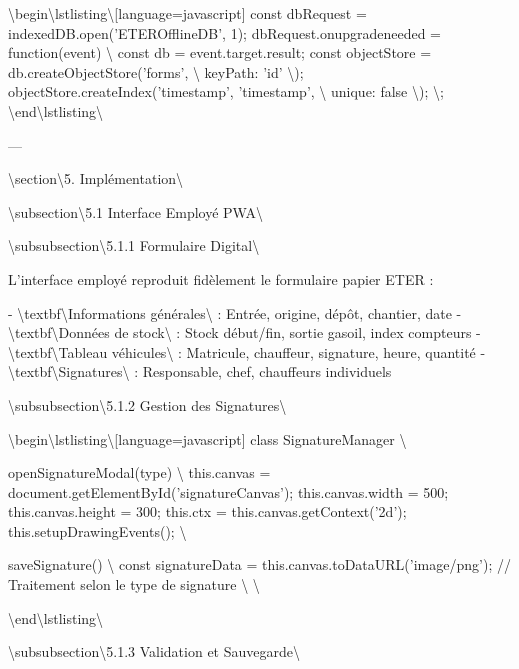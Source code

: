 \documentclass[12pt,a4paper]{report}
\begin{document}
\textbackslash{}begin\textbackslash{}{lstlisting\textbackslash{}}[language=javascript]
const dbRequest = indexedDB.open('ETEROfflineDB', 1);
dbRequest.onupgradeneeded = function(event) \textbackslash{}{
    const db = event.target.result;
    const objectStore = db.createObjectStore('forms', \textbackslash{}{ keyPath: 'id' \textbackslash{}});
    objectStore.createIndex('timestamp', 'timestamp', \textbackslash{}{ unique: false \textbackslash{}});
\textbackslash{}};
\textbackslash{}end\textbackslash{}{lstlisting\textbackslash{}}

---

\textbackslash{}section\textbackslash{}{5. Implémentation\textbackslash{}}

\textbackslash{}subsection\textbackslash{}{5.1 Interface Employé PWA\textbackslash{}}

\textbackslash{}subsubsection\textbackslash{}{5.1.1 Formulaire Digital\textbackslash{}}

L'interface employé reproduit fidèlement le formulaire papier ETER :

- \textbackslash{}textbf\textbackslash{}{Informations générales\textbackslash{}} : Entrée, origine, dépôt, chantier, date
- \textbackslash{}textbf\textbackslash{}{Données de stock\textbackslash{}} : Stock début/fin, sortie gasoil, index compteurs
- \textbackslash{}textbf\textbackslash{}{Tableau véhicules\textbackslash{}} : Matricule, chauffeur, signature, heure, quantité
- \textbackslash{}textbf\textbackslash{}{Signatures\textbackslash{}} : Responsable, chef, chauffeurs individuels

\textbackslash{}subsubsection\textbackslash{}{5.1.2 Gestion des Signatures\textbackslash{}}

\textbackslash{}begin\textbackslash{}{lstlisting\textbackslash{}}[language=javascript]
class SignatureManager \textbackslash{}{
    openSignatureModal(type) \textbackslash{}{
        this.canvas = document.getElementById('signatureCanvas');
        this.canvas.width = 500;
        this.canvas.height = 300;
        this.ctx = this.canvas.getContext('2d');
        this.setupDrawingEvents();
    \textbackslash{}}
    
    saveSignature() \textbackslash{}{
        const signatureData = this.canvas.toDataURL('image/png');
        // Traitement selon le type de signature
    \textbackslash{}}
\textbackslash{}}
\textbackslash{}end\textbackslash{}{lstlisting\textbackslash{}}

\textbackslash{}subsubsection\textbackslash{}{5.1.3 Validation et Sauvegarde\textbackslash{}}
\end{document}
